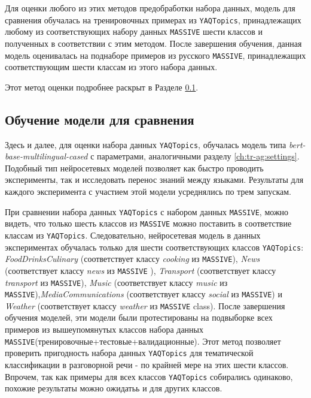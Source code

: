 Для оценки любого из этих методов предобработки набора данных, модель для сравнения обучалась на тренировочных примерах из \texttt{YAQTopics}, принадлежащих любому из соответствующих набору данных \texttt{MASSIVE} шести классов и полученных в соответствии с этим методом. После завершения обучения, данная модель оценивалась на поднаборе примеров из русского \texttt{MASSIVE}, принадлежащих соответствующим шести классам из этого набора данных.

Этот метод оценки подробнее раскрыт в Разделе \ref{comparison_model}.

\subsection{Обучение модели для сравнения}\label{comparison_model}
Здесь и далее, для оценки набора данных \texttt{YAQTopics}, обучалась модель типа \textit{bert-base-multilingual-cased} с параметрами, аналогичными разделу \ref{ch:tr-ag:settings}. Подобный тип нейросетевых моделей позволяет как быстро проводить эксперименты, так и исследовать перенос знаний между языками. Результаты для каждого эксперимента с участием этой модели усреднялись по трем запускам.

При сравнении набора данных \texttt{YAQTopics} с набором данных \texttt{MASSIVE}, можно видеть, что только шесть классов из \texttt{MASSIVE} можно поставить в соответствие классам из  \texttt{YAQTopics}. Следовательно, нейросетевая модель в данных экспериментах обучалась только для шести соответствующих классов \texttt{YAQTopics}: \textit{FoodDrinksCulinary} (соответствует классу \textit{cooking} из \texttt{MASSIVE}), \textit{News} (соответствует классу \textit{news} из \texttt{MASSIVE} ), \textit{Transport} (соответствует классу \textit{transport} из \texttt{MASSIVE}), \textit{Music} (соответствует классу \textit{music} из \texttt{MASSIVE}),\textit{MediaCommunications} (соответствует классу \textit{social} из \texttt{MASSIVE}) и \textit{Weather} (соответствует классу \textit{weather} из \texttt{MASSIVE} class). После завершения обучения моделей, эти модели были протестированы на подвыборке всех примеров из вышеупомянутых классов набора данных \texttt{MASSIVE}(тренировочные+тестовые+валидационные). Этот метод позволяет проверить пригодность набора данных \texttt{YAQTopics} для тематической классификации в разговорной речи - по крайней мере на этих шести классов. Впрочем, так как примеры для всех классов \texttt{YAQTopics} собирались одинаково, похожие результаты можно ожидатьь и для других классов.


